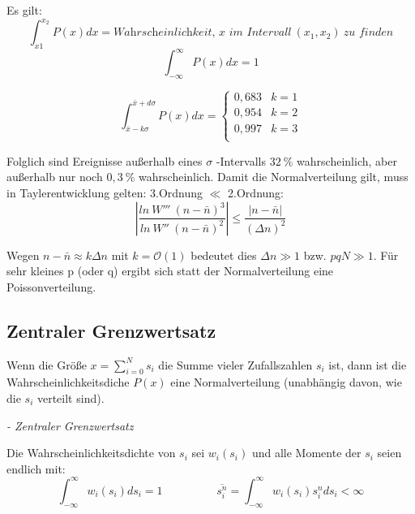 \documentclass[ngerman]{scrartcl}
\newcommand{\abs}[1]{\ensuremath{\left\vert#1\right\vert}}
\begin{document}
	Es gilt:
	\begin{equation}
		\int_{x1}^{x_2} P(x)dx= \textit{Wahrscheinlichkeit, x im Intervall} ~(x_1, x_2)~ \textit{zu finden}
	\end{equation}
	\begin{equation}
		\int_{-\infty}^{\infty} P(x)dx = 1
	\end{equation}
	
	\begin{equation}
		\int_{\bar{x} - k\sigma}^{\bar{x} + d\sigma} P(x)dx =
		\begin{cases}
			0,683 & k=1\\
			0,954 & k=2\\
			0,997 & k=3\\
		\end{cases}
	\end{equation}
	
	Folglich sind Ereignisse außerhalb eines $\sigma$ -Intervalls $32~\%$ wahrscheinlich, aber außerhalb nur noch $0,3~\%$ wahrscheinlich. Damit die Normalverteilung gilt, muss in Taylerentwicklung gelten: 3.Ordnung $\ll$ 2.Ordnung:
	\begin{equation}
		\abs{\frac{ln~W'''~(n-\bar{n})^3}{ln~W''~(n-\bar{n})^2}} \leq \frac{|n-\bar{n}|}{(\Delta n)^2}
	\end{equation}
	
	Wegen $n-\bar{n}\approx k\Delta n $ mit $k=\mathcal{O}(1)$ bedeutet dies $\Delta n \gg 1$ bzw. $pqN\gg 1$. Für sehr kleines p (oder q) ergibt sich statt der Normalverteilung eine Poissonverteilung.
	
	\subsection{Zentraler Grenzwertsatz}
	
	\noindent\hspace{0.15\linewidth}\begin{minipage}{0.77\linewidth}
	\vspace{1cm}
	 Wenn die Größe $x=\sum_{i=0}^N s_i$ die Summe vieler Zufallszahlen $s_i$ ist, dann ist die Wahrscheinlichkeitsdiche $P(x)$ eine Normalverteilung (unabhängig davon, wie die $s_i$ verteilt sind).
	 
	 \vspace{0.2cm}\textit{- Zentraler Grenzwertsatz}
	\end{minipage}\vspace{1cm}
	
	Die Wahrscheinlichkeitsdichte von $s_i$ sei $w_i(s_i)$ und alle Momente der $s_i$ seien endlich mit:
	\begin{equation}
			\int_{-\infty}^{\infty} w_i(s_i)ds_i = 1 \hspace{2cm} \overline{s_i^n}=\int_{-\infty}^{\infty}w_i(s_i)s_i^nds_i < \infty
\end{equation}		
\end{document}
